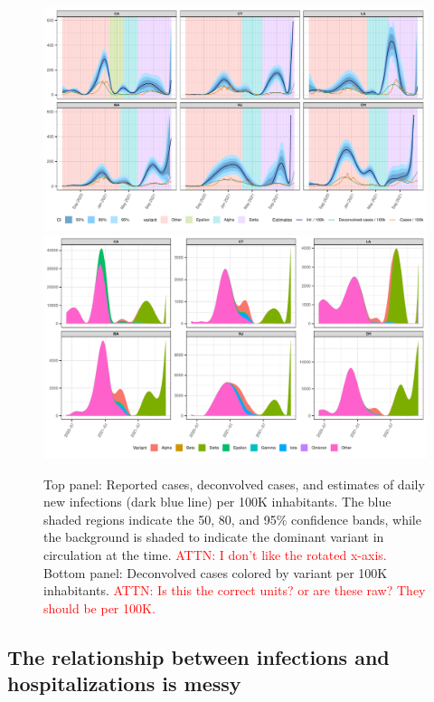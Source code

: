 \documentclass{article}
\newcommand{\attn }[1]{\textcolor{red}{ATTN: #1}}
\begin{document}
\begin{figure}[!tb]
\centering
    \includegraphics[width=\linewidth]{state_niauc_est_6states_F24.pdf}\\
    \includegraphics[width=\linewidth]{state_decon_byvar_est_6states_F24.pdf}
    \caption{Top panel: Reported cases, deconvolved cases, and estimates of daily new infections (dark blue
    line) per 100K inhabitants. The blue shaded regions indicate the 50, 80, and 95\% confidence
    bands, while the background is shaded to indicate the dominant variant in
    circulation at the time. \attn{I don't like the rotated x-axis.} 
    Bottom panel: Deconvolved cases colored by variant per 100K inhabitants. \attn{Is
    this the correct units? or are these raw? They should be per 100K.}}
    \label{fig:six-states}
\end{figure}


\subsection{The relationship between infections and hospitalizations is messy}
\label{sec:lagged-correlations}
\end{document}
